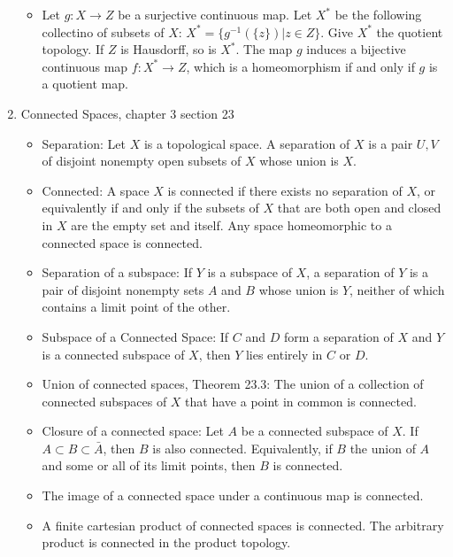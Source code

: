 \documentclass[12pt,letterpaper]{article}
\begin{document}
\begin{enumerate}
\begin{itemize}
    \item \label{thm:HausdorffHomeomorphismQuotientMap} Let $g: X\rightarrow Z$ be a surjective continuous map. Let $X^*$ be the following collectino of subsets of $X$: $X^*=\{g^{-1}(\{z\}) | z\in Z\}$. Give $X^*$ the quotient topology. If $Z$ is Hausdorff, so is $X^*$. The map $g$ induces a bijective continuous map $f: X^*\rightarrow Z$, which is a homeomorphism if and only if $g$ is a quotient map.
  \end{itemize}
  \item \label{sec:connectedness} Connected Spaces, chapter 3 section 23
  \begin{itemize}
    \item \label{dfn:separation} Separation: Let $X$ is a topological space. A separation of $X$ is a pair $U,V$ of disjoint nonempty open subsets of $X$ whose union is $X$.
    \item \label{dfn:connected} Connected: A space $X$ is connected if there exists no separation of $X$, or equivalently if and only if the subsets of $X$ that are both open and closed in $X$ are the empty set and itself. Any space homeomorphic to a connected space is connected.
    \item \label{dfn:subspaceSeperation} Separation of a subspace: If $Y$ is a subspace of $X$, a separation of $Y$ is a pair of disjoint nonempty sets $A$ and $B$ whose union is $Y$, neither of which contains a limit point of the other.
    \item \label{thm:subspaceOfConnected} Subspace of a Connected Space: If $C$ and $D$ form a separation of $X$ and $Y$ is a connected subspace of $X$, then $Y$ lies entirely in $C$ or $D$.
    \item \label{thm:unionConnected} Union of connected spaces, Theorem 23.3: The union of a collection of connected subspaces of $X$ that have a point in common is connected.
    \item \label{thm:closureConnected} Closure of a connected space: Let $A$ be a connected subspace of $X$. If $A\subset B\subset \bar{A}$, then $B$ is also connected. Equivalently, if $B$ the union of $A$ and some or all of its limit points, then $B$ is connected.
    \item \label{thm:continuousConnected} The image of a connected space under a continuous map is connected.

    \item \label{thm:finiteCartesianConnected} A finite cartesian product of connected spaces is connected. The arbitrary product is connected in the product topology.
  \end{itemize}
\end{enumerate}
\end{document}
